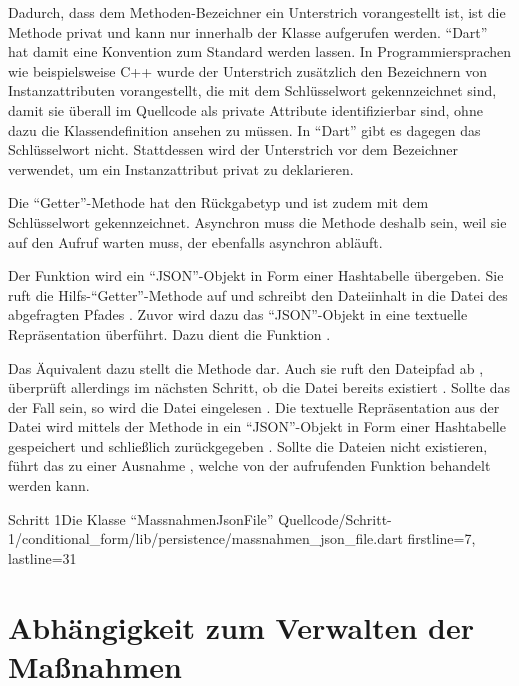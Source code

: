 Dadurch, dass dem Methoden-Bezeichner  ein Unterstrich vorangestellt ist, ist die Methode privat und kann nur innerhalb der Klasse aufgerufen werden.
\enquote{Dart} hat damit eine Konvention zum Standard werden lassen.
In Programmiersprachen wie beispielsweise C++ wurde der Unterstrich zusätzlich den Bezeichnern von Instanzattributen vorangestellt,
die mit dem  Schlüsselwort gekennzeichnet sind,
damit sie überall im Quellcode als private Attribute identifizierbar sind, ohne dazu die Klassendefinition ansehen zu müssen.
In \enquote{Dart} gibt es dagegen das  Schlüsselwort nicht.
Stattdessen wird der Unterstrich vor dem Bezeichner verwendet, um ein Instanzattribut privat zu deklarieren.

Die \enquote{Getter}-Methode  hat den Rückgabetyp  und ist zudem mit dem Schlüsselwort  gekennzeichnet.
Asynchron muss die Methode deshalb sein, weil sie auf den Aufruf  warten muss, der ebenfalls asynchron abläuft.

Der Funktion   wird ein \enquote{JSON}-Objekt in Form einer Hashtabelle übergeben.
Sie ruft die Hilfs-\enquote{Getter}-Methode   auf und schreibt den Dateiinhalt in die Datei des abgefragten Pfades .
Zuvor wird dazu das \enquote{JSON}-Objekt in eine textuelle Repräsentation überführt.
Dazu dient die Funktion .

Das Äquivalent dazu stellt die Methode   dar.
Auch sie ruft den Dateipfad ab , überprüft allerdings im nächsten Schritt, ob die Datei bereits existiert .
Sollte das der Fall sein, so wird die Datei eingelesen .
Die textuelle Repräsentation aus der Datei wird mittels der Methode  in ein \enquote{JSON}-Objekt in Form einer Hashtabelle gespeichert  und schließlich zurückgegeben .
Sollte die Dateien nicht existieren, führt das zu einer Ausnahme , welche von der aufrufenden Funktion behandelt werden kann.

\begin{alexlisting}{Schritt 1}{Die Klasse \enquote{MassnahmenJsonFile}}
  {Quellcode/Schritt-1/conditional_form/lib/persistence/massnahmen_json_file.dart}
  {firstline=7, lastline=31}
  \label{lst:Schritt1KlasseMassnahmenJsonFile}
\end{alexlisting}

\clearpage
\section{ Abhängigkeit zum Verwalten der Maßnahmen}

